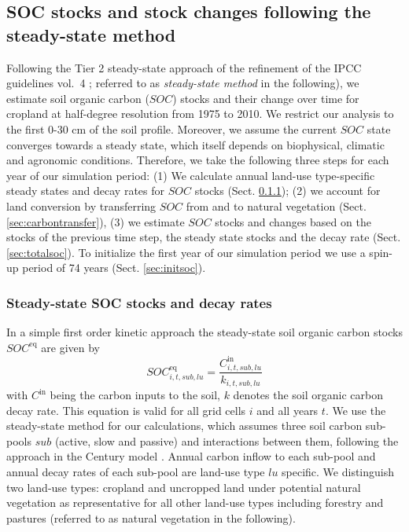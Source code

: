 \documentclass[gc, manuscript]{copernicus}
\begin{document}
\hypertarget{sec:carbonbudget}{%
\subsection{SOC stocks and stock changes following the steady-state method}\label{sec:carbonbudget}}

Following the Tier 2 steady-state approach of the refinement of the IPCC guidelines vol.~4 \citep{calvo_buendia_ipcc_2019}; referred to as \textit{steady-state method} in the following), we estimate soil organic carbon (\(SOC\)) stocks and their change over time for cropland at half-degree resolution from 1975 to 2010. We restrict our analysis to the first 0-30 cm of the soil profile. Moreover, we assume the current \(SOC\) state converges towards a steady state, which itself depends on biophysical, climatic and agronomic conditions.
Therefore, we take the following three steps for each year of our simulation period:
(1) We calculate annual land-use type-specific steady states and decay rates for \(SOC\) stocks (Sect. \ref{sec:steadystates});
(2) we account for land conversion by transferring \(SOC\) from and to natural vegetation (Sect. \ref{sec:carbontransfer}),
(3) we estimate \(SOC\) stocks and changes based on the stocks of the previous time step, the steady state stocks and the decay rate (Sect. \ref{sec:totalsoc}).
To initialize the first year of our simulation period we use a spin-up period of 74 years (Sect. \ref{sec:initsoc}).

\hypertarget{sec:steadystates}{%
\subsubsection{Steady-state SOC stocks and decay rates}\label{sec:steadystates}}

In a simple first order kinetic approach the steady-state soil organic carbon stocks \(SOC^{\mathrm{eq}}\) are given by
\begin{equation}
SOC^{\mathrm{eq}}_{i,t,sub,lu} =\frac{C^{\mathrm{in}}_{i,t,sub,lu}}{k_{i,t,sub,lu}}
\label{eq:inoutflow}
\end{equation}
with \(C^{\textrm{in}}\) being the carbon inputs to the soil, \(k\) denotes the soil organic carbon decay rate. This equation is valid for all grid cells \(i\) and all years \(t\). We use the steady-state method for our calculations, which assumes three soil carbon sub-pools \(sub\) (active, slow and passive) and interactions between them, following the approach in the Century model \citep{parton_analysis_1987}. Annual carbon inflow to each sub-pool and annual decay rates of each sub-pool are land-use type \(lu\) specific.
We distinguish two land-use types: cropland and uncropped land under potential natural vegetation as representative for all other land-use types including forestry and pastures (referred to as natural vegetation in the following).
\end{document}
